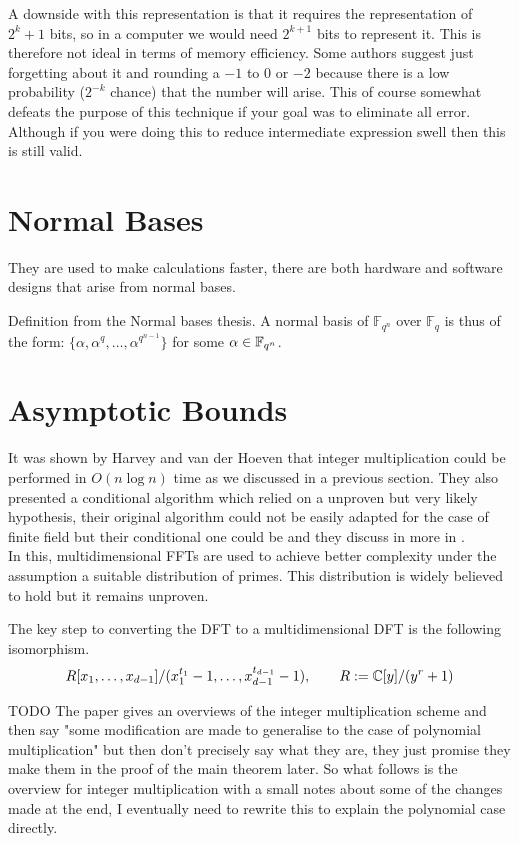 A downside with this representation is that it requires the representation of $2^k + 1$ bits, so in a computer we would need $2^{k+1}$ bits to represent it. This is therefore not ideal in terms of memory efficiency. Some authors suggest just forgetting about it and rounding a $-1$ to $0$ or $-2$ because there is a low probability ($2^{-k}$ chance) that the number will arise. This of course somewhat defeats the purpose of this technique if your goal was to eliminate all error. Although if you were doing this to reduce intermediate expression swell then this is still valid.\\


\section{Normal Bases}
They are used to make calculations faster, there are both hardware and software designs that arise from normal bases.

Definition from the Normal bases thesis.
A normal basis of $\mathbb{F}_{q^n}$ over $\mathbb{F}_q$ is thus of the form: $\{\alpha,\alpha^q,\ldots ,\alpha^{q^{n-1}}\}$ for some $\alpha \in \mathbb{F}_{q^n}$.


\section{Asymptotic Bounds}

It was shown by Harvey and van der Hoeven \cite{nlogn} that integer multiplication could be performed in $O(n\log n)$ time as we discussed in a previous section. They also presented a conditional algorithm which relied on a unproven but very likely hypothesis, their original algorithm could not be easily adapted for the case of finite field but their conditional one could be and they discuss in more in \cite{ffnlogn}.\\
In this, multidimensional FFTs are used to achieve better complexity under the assumption a suitable distribution of primes. This distribution is widely believed to hold but it remains unproven.

The key step to converting the DFT to a multidimensional DFT is the following isomorphism.
\begin{equation}\label{eq:here}
    R[x_1, \ldots, x_{d-1}] / (x_1^{t_1} - 1, \ldots, x_{d-1}^{t_{d-1}} - 1), \qquad R := \mathbb{C}[y]/(y^r + 1)
\end{equation}

TODO The paper gives an overviews of the integer multiplication scheme and then say "some modification are made to generalise to the case of polynomial multiplication" but then don't precisely say what they are, they just promise they make them in the proof of the main theorem later. So what follows is the overview for integer multiplication with a small notes about some of the changes made at the end, I eventually need to rewrite this to explain the polynomial case directly.
\medskip

